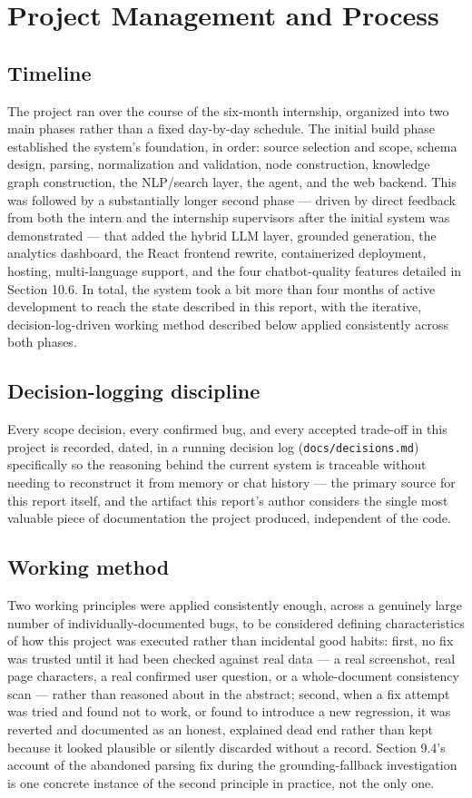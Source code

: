 \chapter{Project Management and Process}
\label{ch:project-management-and-process}
\section{Timeline}
The project ran over the course of the six-month internship, organized into two main phases rather than a fixed day-by-day schedule. The initial build phase established the system's foundation, in order: source selection and scope, schema design, parsing, normalization and validation, node construction, knowledge graph construction, the NLP/search layer, the agent, and the web backend. This was followed by a substantially longer second phase — driven by direct feedback from both the intern and the internship supervisors after the initial system was demonstrated — that added the hybrid LLM layer, grounded generation, the analytics dashboard, the React frontend rewrite, containerized deployment, hosting, multi-language support, and the four chatbot-quality features detailed in Section 10.6. In total, the system took a bit more than four months of active development to reach the state described in this report, with the iterative, decision-log-driven working method described below applied consistently across both phases.

\section{Decision-logging discipline}
Every scope decision, every confirmed bug, and every accepted trade-off in this project is recorded, dated, in a running decision log (\texttt{docs/\allowbreak{}decisions.md}) specifically so the reasoning behind the current system is traceable without needing to reconstruct it from memory or chat history — the primary source for this report itself, and the artifact this report's author considers the single most valuable piece of documentation the project produced, independent of the code.

\section{Working method}
Two working principles were applied consistently enough, across a genuinely large number of individually-documented bugs, to be considered defining characteristics of how this project was executed rather than incidental good habits: first, no fix was trusted until it had been checked against real data — a real screenshot, real page characters, a real confirmed user question, or a whole-document consistency scan — rather than reasoned about in the abstract; second, when a fix attempt was tried and found not to work, or found to introduce a new regression, it was reverted and documented as an honest, explained dead end rather than kept because it looked plausible or silently discarded without a record. Section 9.4's account of the abandoned parsing fix during the grounding-fallback investigation is one concrete instance of the second principle in practice, not the only one.

